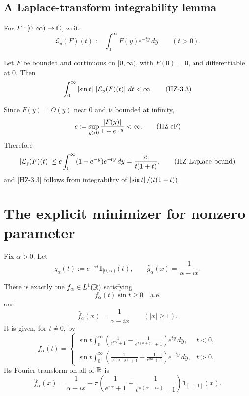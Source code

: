 \subsection{A Laplace-transform integrability lemma}

For $F:[0,\infty)\to\mathbb{C}$, write
\[
  \mathcal L_y(F)(t):=\int_0^\infty F(y)e^{-ty}\,dy
  \qquad(t>0).
  \tag{HZ-Laplace}\label{HZ-Laplace}
\]

\begin{lemma}
Let $F$ be bounded and continuous on $[0,\infty)$, with $F(0)=0$, and differentiable at $0$. Then
\[
  \int_0^\infty\left\lvert \sin t\right\rvert\,
     \left\lvert \mathcal L_y(F)(t)\right\rvert\,dt<\infty.
  \tag{HZ-3.3}\label{HZ-3.3}
\]
\end{lemma}

Since $F(y)=O(y)$ near $0$ and is bounded at infinity,
\[
  c:=\sup_{y>0}\frac{\left\lvert F(y)\right\rvert}{1-e^{-y}}<\infty.
  \tag{HZ-cF}\label{HZ-cF}
\]
Therefore
\[
  \left\lvert \mathcal L_y(F)(t)\right\rvert
  \le c\int_0^\infty(1-e^{-y})e^{-ty}\,dy
  =\frac{c}{t(1+t)},
  \tag{HZ-Laplace-bound}\label{HZ-Laplace-bound}
\]
and \eqref{HZ-3.3} follows from integrability of $\left\lvert \sin t\right\rvert/(t(1+t))$.

\section{The explicit minimizer for nonzero parameter}


Fix $\alpha>0$. Let
\[
  g_\alpha(t):=e^{-\alpha t}\mathbf1_{[0,\infty)}(t),
  \qquad
  \widehat g_\alpha(x)=\frac1{\alpha-ix}.
  \tag{HZ-galpha}\label{HZ-galpha}
\]

\begin{lemma}
There is exactly one $f_\alpha\in L^1(\mathbb{R})$ satisfying
\[
  f_\alpha(t)\sin t\ge0\quad\text{a.e.}
  \tag{HZ-3.4-sign}\label{HZ-3.4-sign}
\]
and
\[
  \widehat f_\alpha(x)=\frac1{\alpha-ix}
  \qquad(|x|\ge1).
  \tag{HZ-3.4-data}\label{HZ-3.4-data}
\]
It is given, for $t\ne0$, by
\[
 f_\alpha(t)=
 \begin{cases}
 \displaystyle
 \sin t\int_0^\infty
 \left(\frac1{e^{\pi\alpha}+1}
       -\frac1{e^{\pi(\alpha+y)}+1}\right)e^{ty}\,dy,
 &t<0,\\[2.2ex]
 \displaystyle
 \sin t\int_0^\infty
 \left(\frac1{e^{\pi(\alpha-y)}+1}
       -\frac1{e^{\pi\alpha}+1}\right)e^{-ty}\,dy,
 &t>0.
 \end{cases}
 \tag{HZ-3.4-formula}\label{HZ-3.4-formula}
\]
Its Fourier transform on all of $\mathbb{R}$ is
\[
 \widehat f_\alpha(x)
 =\frac1{\alpha-ix}
 -\pi\left(
     \frac1{e^{\pi\alpha}+1}
     +\frac1{e^{\pi(\alpha-ix)}-1}
   \right)\mathbf1_{[-1,1]}(x).
 \tag{HZ-3.4-Fourier}\label{HZ-3.4-Fourier}
\]
\end{lemma}

